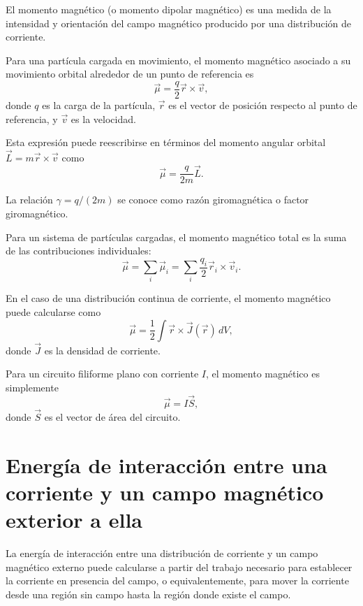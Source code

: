 \documentclass[12pt,a4paper]{book}
\begin{document}
El momento magnético (o momento dipolar magnético) es una medida de la intensidad y orientación del campo magnético producido por una distribución de corriente.

Para una partícula cargada en movimiento, el momento magnético asociado a su movimiento orbital alrededor de un punto de referencia es
\begin{equation}
\vec{\mu} = \frac{q}{2} \vec{r} \times \vec{v},
\end{equation}
donde $q$ es la carga de la partícula, $\vec{r}$ es el vector de posición respecto al punto de referencia, y $\vec{v}$ es la velocidad.

Esta expresión puede reescribirse en términos del momento angular orbital $\vec{L} = m\vec{r} \times \vec{v}$ como
\begin{equation}
\vec{\mu} = \frac{q}{2m} \vec{L}.
\end{equation}

La relación $\gamma = q/(2m)$ se conoce como razón giromagnética o factor giromagnético.

Para un sistema de partículas cargadas, el momento magnético total es la suma de las contribuciones individuales:
\begin{equation}
\vec{\mu} = \sum_i \vec{\mu}_i = \sum_i \frac{q_i}{2} \vec{r}_i \times \vec{v}_i.
\end{equation}

En el caso de una distribución continua de corriente, el momento magnético puede calcularse como
\begin{equation}
\vec{\mu} = \frac{1}{2} \int \vec{r} \times \vec{J}(\vec{r}) \, dV,
\end{equation}
donde $\vec{J}$ es la densidad de corriente.

Para un circuito filiforme plano con corriente $I$, el momento magnético es simplemente
\begin{equation}
\vec{\mu} = I \vec{S},
\end{equation}
donde $\vec{S}$ es el vector de área del circuito.

\section{Energía de interacción entre una corriente y un campo magnético exterior a ella}

La energía de interacción entre una distribución de corriente y un campo magnético externo puede calcularse a partir del trabajo necesario para establecer la corriente en presencia del campo, o equivalentemente, para mover la corriente desde una región sin campo hasta la región donde existe el campo.
\end{document}
